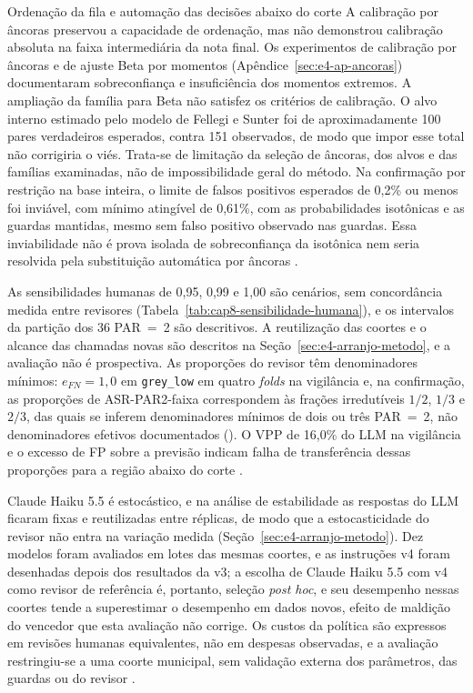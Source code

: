 \begin{chapter}{Ordenação da fila e automação das decisões abaixo do corte}
A calibração por âncoras preservou a capacidade de ordenação, mas não demonstrou calibração absoluta na faixa intermediária da nota final. Os experimentos de calibração por âncoras e de ajuste Beta por momentos (Apêndice~\ref{sec:e4-ap-ancoras}) documentaram sobreconfiança e insuficiência dos momentos extremos. A ampliação da família para Beta não satisfez os critérios de calibração. O alvo interno estimado pelo modelo de Fellegi e Sunter foi de aproximadamente 100 pares verdadeiros esperados, contra 151 observados, de modo que impor esse total não corrigiria o viés. Trata-se de limitação da seleção de âncoras, dos alvos e das famílias examinadas, não de impossibilidade geral do método. Na confirmação por restrição na base inteira, o limite de falsos positivos esperados de 0,2\% ou menos foi inviável, com mínimo atingível de 0,61\%, com as probabilidades isotônicas e as guardas mantidas, mesmo sem falso positivo observado nas guardas. Essa inviabilidade não é prova isolada de sobreconfiança da isotônica nem seria resolvida pela substituição automática por âncoras \cite{Jardim2026phdrepo}.

As sensibilidades humanas de 0,95, 0,99 e 1,00 são cenários, sem concordância medida entre revisores (Tabela~\ref{tab:cap8-sensibilidade-humana}), e os intervalos da partição dos 36 PAR~=~2 são descritivos. A reutilização das coortes e o alcance das chamadas novas são descritos na Seção~\ref{sec:e4-arranjo-metodo}, e a avaliação não é prospectiva. As proporções do revisor têm denominadores mínimos: $e_{FN}=1{,}0$ em \texttt{grey\_low} em quatro \textit{folds} na vigilância e, na confirmação, as proporções de ASR-PAR2-faixa correspondem às frações irredutíveis $1/2$, $1/3$ e $2/3$, das quais se inferem denominadores mínimos de dois ou três PAR~=~2, não denominadores efetivos documentados (). O VPP de 16,0\% do LLM na vigilância e o excesso de FP sobre a previsão indicam falha de transferência dessas proporções para a região abaixo do corte \cite{Jardim2026phdrepo}.

Claude Haiku 5.5 é estocástico, e na análise de estabilidade as respostas do LLM ficaram fixas e reutilizadas entre réplicas, de modo que a estocasticidade do revisor não entra na variação medida (Seção~\ref{sec:e4-arranjo-metodo}). Dez modelos foram avaliados em lotes das mesmas coortes, e as instruções v4 foram desenhadas depois dos resultados da v3; a escolha de Claude Haiku 5.5 com v4 como revisor de referência é, portanto, seleção \textit{post hoc}, e seu desempenho nessas coortes tende a superestimar o desempenho em dados novos, efeito de maldição do vencedor que esta avaliação não corrige. Os custos da política são expressos em revisões humanas equivalentes, não em despesas observadas, e a avaliação restringiu-se a uma coorte municipal, sem validação externa dos parâmetros, das guardas ou do revisor \cite{Jardim2026phdrepo}.


\end{chapter}

